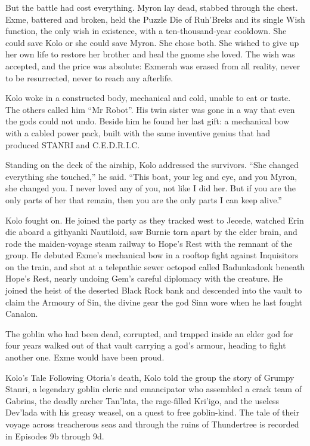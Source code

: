 But the battle had cost everything.  Myron lay dead, stabbed through the chest.  Exme, battered and broken, held the Puzzle Die of Ruh'Breks and its single Wish function, the only wish in existence, with a ten-thousand-year cooldown.  She could save Kolo or she could save Myron.  She chose both.  She wished to give up her own life to restore her brother and heal the gnome she loved.  The wish was accepted, and the price was absolute: Exmerah was erased from all reality, never to be resurrected, never to reach any afterlife.

Kolo woke in a constructed body, mechanical and cold, unable to eat or taste.  The others called him ``Mr Robot''.  His twin sister was gone in a way that even the gods could not undo.  Beside him he found her last gift: a mechanical bow with a cabled power pack, built with the same inventive genius that had produced STANRI and C.E.D.R.I.C.

Standing on the deck of the airship, Kolo addressed the survivors.  ``She changed everything she touched,'' he said.  ``This boat, your leg and eye, and you Myron, she changed you.  I never loved any of you, not like I did her.  But if you are the only parts of her that remain, then you are the only parts I can keep alive.''

Kolo fought on.  He joined the party as they tracked west to Jecede, watched Erin die aboard a githyanki Nautiloid, saw Burnie torn apart by the elder brain, and rode the maiden-voyage steam railway to Hope's Rest with the remnant of the group.  He debuted Exme's mechanical bow in a rooftop fight against Inquisitors on the train, and shot at a telepathic sewer octopod called Badunkadonk beneath Hope's Rest, nearly undoing Gem's careful diplomacy with the creature.  He joined the heist of the deserted Black Rock bank and descended into the vault to claim the Armoury of Sin, the divine gear the god Sinn wore when he last fought Canalon.

The goblin who had been dead, corrupted, and trapped inside an elder god for four years walked out of that vault carrying a god's armour, heading to fight another one.  Exme would have been proud.

\begin{DndSidebar}{Kolo's Tale}
Following Otoria's death, Kolo told the group the story of Grumpy Stanri, a legendary goblin cleric and emancipator who assembled a crack team of Gabrins, the deadly archer Tan'lata, the rage-filled Kri'igo, and the useless Dev'lada with his greasy weasel, on a quest to free goblin-kind.  The tale of their voyage across treacherous seas and through the ruins of Thundertree is recorded in Episodes 9b through 9d.
\end{DndSidebar}

\clearpage
